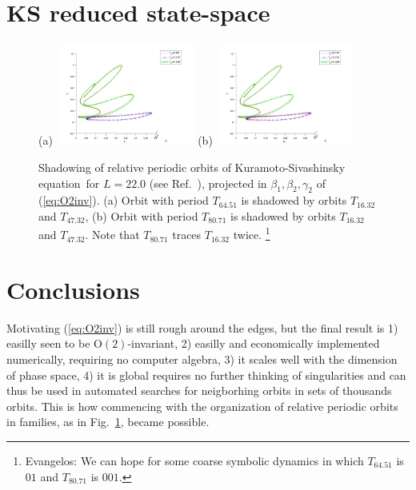 \documentclass[aip,cha,showpacs,twocolumn,
 		  reprint]{revtex4-1} %
\newcommand{\refref} [1] {Ref.~\cite{#1}}
\newcommand{\refeq}  [1] {(\ref{#1})}
\newcommand{\reffig} [1] {Fig.~\ref{#1}}
\newcommand{\KSe}{Kuramoto-Siva\-shin\-sky equation}
\newcommand{\On}[1]{\ensuremath{\textrm{O}(#1)}}
\newcommand{\ES}[1]{\footnote{Evangelos: #1}}
\begin{document}
\section{KS reduced state-space}

\begin{figure}
 (a)~\includegraphics[width=0.40\textwidth]{../figs/ks22rpo_shad1}
 (b)~\includegraphics[width=0.40\textwidth]{../figs/ks22rpo_shad2}
\caption{
 Shadowing of relative periodic orbits of \KSe\ for $L=22.0$ (see \refref{SCD07}),
projected in $\beta_1, \beta_2, \gamma_2$ of
\refeq{eq:O2inv}. (a) Orbit with period $T_{64.51}$ is shadowed by
orbits $T_{16.32}$ and $T_{47.32}$, (b) Orbit with period
$T_{80.71}$ is shadowed by orbits $T_{16.32}$ and $T_{47.32}$. Note
that $T_{80.71}$ traces $T_{16.32}$ twice.
\ES{We can hope for some coarse symbolic dynamics in which  $T_{64.51}$  is $01$ and
$T_{80.71}$ is $001$.}
}
\label{fig:rpo_shad}
\end{figure}


\section{Conclusions}

Motivating \refeq{eq:O2inv} is still rough around the edges, but the final result is
1) easilly seen to be $\On{2}$-invariant, 2) easilly and economically
implemented numerically, requiring no computer algebra, 3) it scales well
with the dimension of phase space, 4) it is global requires no further
thinking of singularities and can thus be used in automated searches for
neigborhing orbits in sets of thousands orbits. This is how commencing with the
organization of relative periodic orbits in families, as in \reffig{fig:rpo_shad},
became possible.


\end{document}
